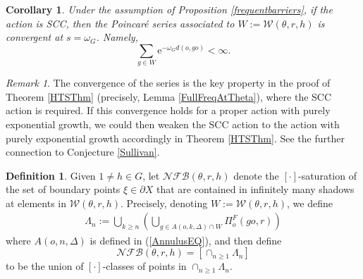 \documentclass{amsart}
\newtheorem{cor}[thm]{Corollary}
\theoremstyle{definition}
\newtheorem{defn}[thm]{Definition}
\theoremstyle{remark}
\newtheorem*{rem}{Remark}
\newcommand{\pU}{\partial{  X}}
\newcommand{\e}[1]{\omega_{#1}}
\begin{document}
\begin{cor}\label{WconvergencePSseries}
Under the assumption of Proposition \ref{frequentbarriers}, if the action is SCC, then the Poincar\'e series associated to $W:=\mathcal W(\theta,r,h)$  is convergent at $s=\e G$. Namely,
$$
\sum_{g\in W} \mathrm{e}^{-\e G d(o,go)}<\infty.
$$
\end{cor}
\begin{rem}
The convergence of the series is the key property in the proof of Theorem \ref{HTSThm} (precisely, Lemma \ref{FullFreqAtTheta}),  where  the SCC action is required. If  this convergence  holds for a proper action with purely exponential growth, we could then weaken the SCC  action to the action with purely exponential growth accordingly in Theorem \ref{HTSThm}. See the further connection to Conjecture \ref{Sullivan}.   %
\end{rem}




\begin{defn}\label{defn:NFB}
Given $1\ne h\in G$, let  $\mathcal{NFB}(\theta,r, h)$  denote the $[\cdot]$-saturation of the set of  boundary points $\xi\in \pU$ that are contained in infinitely many shadows at elements in $\mathcal W(\theta,r,h)$.  Precisely, denoting $W:=\mathcal W(\theta,r,h)$, we define   
\begin{align}\label{eqn:LambdanforNFB}
\Lambda_n:=  \bigcup\limits_{k\ge n}\left(\bigcup\limits_{g \in   A(o, k,\Delta)\cap {W} }  \Pi_{o}^F(go,r)\right) 
\end{align} 
where   $A(o,n,\Delta)$ is defined in (\ref{AnnulusEQ}), and then define $$\mathcal{NFB}(\theta,r, h)= [\cap_{n\ge 1} \Lambda_n]$$ to be the union of $[\cdot]$-classes of points in $\cap_{n\ge 1} \Lambda_n$. %
\end{defn}
\end{document}
